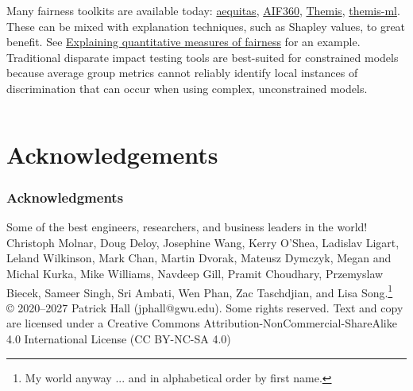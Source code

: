 \documentclass[11pt,aspectratio=169,hyperref={colorlinks}]{beamer}
\begin{document}
\begin{frame}
\begin{columns}
		
				Many fairness toolkits are available today: \href{https://github.com/dssg/aequitas}{aequitas}, \href{https://github.com/IBM/AIF360}{AIF360}, \href{https://github.com/LASER-UMASS/Themis}{Themis}, \href{https://github.com/cosmicBboy/themis-ml}{themis-ml}.\\
				\vspace{5pt}
				These can be mixed with explanation techniques, such as Shapley values, to great benefit. See  \href{https://bit.ly/2R3dXlu}{
					Explaining quantitative measures of fairness} for an example. 
				\\
				\vspace{5pt}
				Traditional disparate impact testing tools are best-suited for constrained models because average group metrics cannot reliably identify local instances of discrimination that can occur when using complex, unconstrained models.   
				
			\end{columns}
	
	\end{frame}

		
\section{Acknowledgements} 

	\begin{frame}
	
		\frametitle{Acknowledgments}
		
		Some of the best engineers, researchers, and business leaders in the world!\\
		\vspace{10pt}
		Christoph Molnar, Doug Deloy, Josephine Wang, Kerry O'Shea, Ladislav Ligart, Leland Wilkinson, Mark Chan, Martin Dvorak, Mateusz Dymczyk, Megan and Michal Kurka, Mike Williams, Navdeep Gill, Pramit Choudhary, Przemyslaw Biecek, Sameer Singh, Sri Ambati, Wen Phan, Zac Taschdjian, and Lisa Song.\footnote{\tiny{My world anyway ... and in alphabetical order by first name.}}\\
		\vspace{10pt}
		© 2020–2027 Patrick Hall (jphall@gwu.edu). Some rights reserved. Text and copy are licensed under a Creative Commons Attribution-NonCommercial-ShareAlike 4.0 International License (CC BY-NC-SA 4.0) 

	\end{frame}	
			
\end{document}
